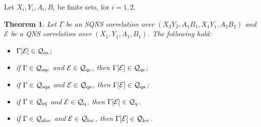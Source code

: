 \documentclass[11pt]{amsart}
\newtheorem{theorem}{Theorem}[section]
\newcommand{\cl}[1]{\mathcal{#1}}
\begin{document}
Let $X_{i}, Y_{i}, A_{i}, B_{i}$ be finite sets, for $i = 1, 2$. 
\begin{theorem}\label{strat_transp}
Let $\Gamma$ be an SQNS correlation over $(X_{2}Y_{2}, A_{1}B_{1}, X_{1}Y_{1}, A_{2}B_{2})$ and $\cl{E}$ be a QNS correlation over $(X_{1}, Y_{1}, A_{1}, B_{1})$. The following hold:
\begin{itemize}
	\item[(i)] $\Gamma[\cl{E}] \in \cl{Q}_{\rm ns}$;
	\item[(ii)] if $\Gamma \in \cl{Q}_{\rm sqc}$ and $\cl{E} \in \cl{Q}_{\rm qc}$, then $\Gamma[\cl{E}] \in \cl{Q}_{\rm qc}$;
	\item[(iii)] if $\Gamma \in \cl{Q}_{\rm sqa}$ and $\cl{E} \in \cl{Q}_{\rm qa}$, then $\Gamma[\cl{E}] \in \cl{Q}_{\rm qa}$;
	\item[(iv)] if $\Gamma \in \cl{Q}_{\rm sq}$ and $\cl{E} \in \cl{Q}_{\rm q}$, then $\Gamma[\cl{E}] \in \cl{Q}_{\rm q}$.
	\item[(v)] if $\Gamma \in \cl{Q}_{\rm sloc}$ and $\cl{E} \in \cl{Q}_{\rm loc}$, then $\Gamma[\cl{E}] \in \cl{Q}_{\rm loc}$.
\end{itemize}
\end{theorem}
\end{document}

